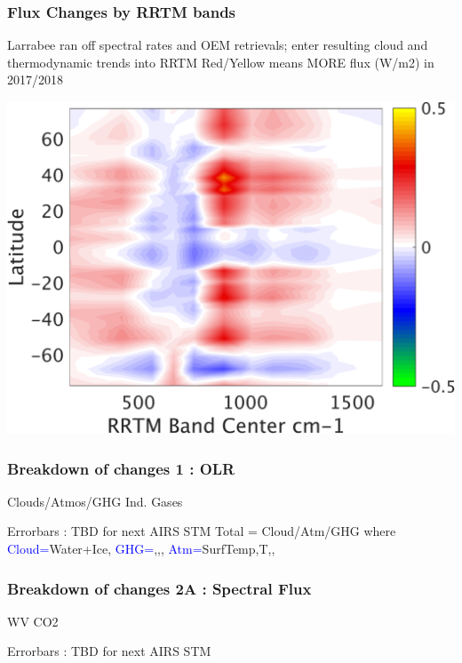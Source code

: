 \documentclass[10pt,t]{beamer}
\begin{document}
\begin{frame}
  \frametitle{Flux Changes by RRTM bands}
  Larrabee ran off spectral rates and OEM retrievals; enter resulting cloud and thermodynamic trends into RRTM \newline
  Red/Yellow means MORE flux (W/m2) in 2017/2018 \newline
  \begin{center}
    \noindent\includegraphics[width=0.625\linewidth]{Figs/umbc_vs_band_fluxrates.png}
  \end{center}
\end{frame}

\begin{frame}
  \frametitle{Breakdown of changes 1 : OLR}
  \hspace{0.50in} Clouds/Atmos/GHG  \hspace{1.5in} Ind. Gases \\
  \begin{center}
  \end{center}
 Errorbars : TBD for next AIRS STM \newline
 Total = Cloud/Atm/GHG where \newline
 \textcolor{blue}{Cloud=}Water+Ice, \textcolor{blue}{GHG=}\cd,\methane,\nitrous, \textcolor{blue}{Atm=}SurfTemp,T,\water,\ozone
\end{frame}

\begin{frame}
  \frametitle{Breakdown of changes 2A : Spectral Flux}
  \hspace{0.50in} WV  \hspace{1.5in} CO2 \\
  \begin{center}
  \end{center}
 Errorbars : TBD for next AIRS STM
\end{frame}
\end{document}
